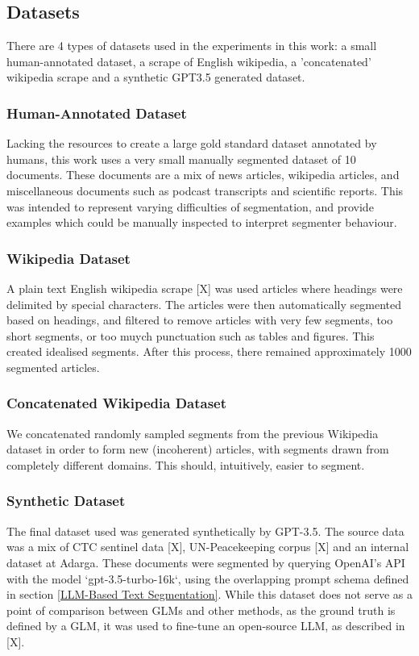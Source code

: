 \subsection{Datasets}

There are 4 types of datasets used in the experiments in this work: a small human-annotated dataset, a scrape of English wikipedia, a 'concatenated' wikipedia scrape and a synthetic GPT3.5 generated dataset.

\subsubsection{Human-Annotated Dataset}

Lacking the resources to create a large gold standard dataset annotated by humans, this work uses a very small manually segmented dataset of 10 documents. These documents are a mix of news articles, wikipedia articles, and miscellaneous documents such as podcast transcripts and scientific reports. This was intended to represent varying difficulties of segmentation, and provide examples which could be manually inspected to interpret segmenter behaviour.

\subsubsection{Wikipedia Dataset}

A plain text English wikipedia scrape [X] was used articles where headings were delimited by special characters. The articles were then automatically segmented based on headings, and filtered to remove articles with very few segments, too short segments, or too muych punctuation such as tables and figures. This created idealised segments. After this process, there remained approximately 1000 segmented articles.

\subsubsection{Concatenated Wikipedia Dataset}

We concatenated randomly sampled segments from the previous Wikipedia dataset in order to form new (incoherent) articles, with segments drawn from completely different domains. This should, intuitively, easier to segment.

\subsubsection{Synthetic Dataset}

The final dataset used was generated synthetically by GPT-3.5. The source data was a mix of CTC sentinel data [X], UN-Peacekeeping corpus [X] and an internal dataset at Adarga. These documents were segmented by querying OpenAI's API with the model `gpt-3.5-turbo-16k`, using the overlapping prompt schema defined in section \ref{LLM-Based Text Segmentation}. While this dataset does not serve as a point of comparison between GLMs and other methods, as the ground truth is defined by a GLM, it was used to fine-tune an open-source LLM, as described in [X].
